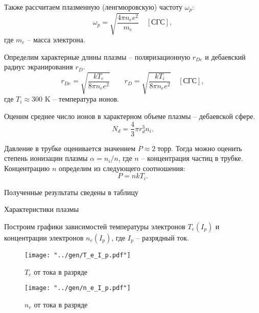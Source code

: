 Также рассчитаем плазменную (ленгмюровскую) частоту $\omega_p$:
$$ \omega_p = \sqrt{\frac{4\pi n_e e^2}{m_e}} \quad [\text{СГС}],$$
где $m_e$ -- масса электрона.

Определим характерные длины плазмы -- поляризационную $r_{De}$ и дебаевский радиус экранирования $r_D$.
$$ r_{De} = \sqrt{\frac{kT_e}{8\pi n_e e^2}} \qquad r_D = \sqrt{\frac{kT_i}{8\pi n_e e^2}}  \quad [\text{СГС}],$$
где $T_i \approx 300$ K -- температура ионов.

Оценим среднее число ионов в характерном объеме плазмы -- дебаевской сфере.
$$ N_d = \frac{4}{3} \pi r_d^3 n_i.$$

Давление в трубке оценивается значением $P \approx 2 \; \text{торр}$. Тогда можно оценить степень ионизации плазмы $\alpha = n_i/n$, где $n$ -- концентрация частиц в трубке. Концентрацию $n$ определим из следующего соотношения:
$$ P = n k T_i.$$

Полученные результаты сведены в таблицу

\begin{table}[H]
	\centering
	\footnotesize
	
	\caption{Характеристики плазмы}
	\label{tab:diff}
\end{table}


Построим графики зависимостей температуры электронов $T_e(I_p)$ и концентрации электронов $n_e(I_p)$, где $I_p$ -- разрядный ток.

\begin{figure}[H]
	\centering
	\begin{minipage}[c]{.5\textwidth}
		\centering
		\texttt{[image: "../gen/T\_e\_I\_p.pdf"]}
		\caption{$T_e$ от тока в разряде}
		\label{img:teip}
	\end{minipage}%
	\begin{minipage}[c]{.5\textwidth}
		\centering
		\texttt{[image: "../gen/n\_e\_I\_p.pdf"]}
		\caption{$n_e$ от тока в разряде}
		\label{img:neip}
	\end{minipage}
\end{figure}


